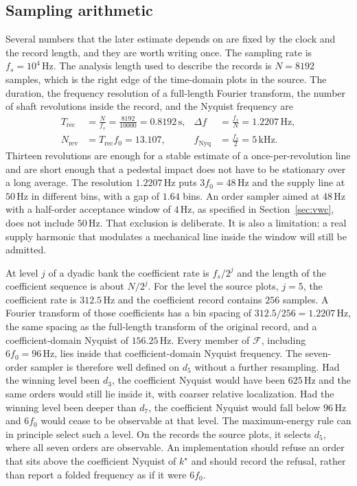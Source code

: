 \subsection{Sampling arithmetic}

Several numbers that the later estimate depends on are fixed by the clock and the record length, and they are worth writing once.
The sampling rate is \(f_{s}=10^{4}\,\mathrm{Hz}\).
The analysis length used to describe the records is \(N=8192\) samples, which is the right edge of the time-domain plots in the source.
The duration, the frequency resolution of a full-length Fourier transform, the number of shaft revolutions inside the record, and the Nyquist frequency are
\begin{align}
T_{\mathrm{rec}}&=\frac{N}{f_{s}}=\frac{8192}{10000}=0.8192\,\mathrm{s},&
\Delta f&=\frac{f_{s}}{N}=1.2207\,\mathrm{Hz},\\
N_{\mathrm{rev}}&=T_{\mathrm{rec}} f_{0}=13.107,&
f_{\mathrm{Nyq}}&=\frac{f_{s}}{2}=5\,\mathrm{kHz}.
\label{eq:arith}
\end{align}
Thirteen revolutions are enough for a stable estimate of a once-per-revolution line and are short enough that a pedestal impact does not have to be stationary over a long average.
The resolution \(1.2207\,\mathrm{Hz}\) puts \(3f_{0}=48\,\mathrm{Hz}\) and the supply line at \(50\,\mathrm{Hz}\) in different bins, with a gap of \(1.64\) bins.
An order sampler aimed at \(48\,\mathrm{Hz}\) with a half-order acceptance window of \(4\,\mathrm{Hz}\), as specified in Section~\ref{sec:vwc}, does not include \(50\,\mathrm{Hz}\).
That exclusion is deliberate.
It is also a limitation: a real supply harmonic that modulates a mechanical line inside the window will still be admitted.

At level \(j\) of a dyadic bank the coefficient rate is \(f_{s}/2^{j}\) and the length of the coefficient sequence is about \(N/2^{j}\).
For the level the source plots, \(j=5\), the coefficient rate is \(312.5\,\mathrm{Hz}\) and the coefficient record contains \(256\) samples.
A Fourier transform of those coefficients has a bin spacing of \(312.5/256=1.2207\,\mathrm{Hz}\), the same spacing as the full-length transform of the original record, and a coefficient-domain Nyquist of \(156.25\,\mathrm{Hz}\).
Every member of \(\mathcal{F}\), including \(6f_{0}=96\,\mathrm{Hz}\), lies inside that coefficient-domain Nyquist frequency.
The seven-order sampler is therefore well defined on \(d_{5}\) without a further resampling.
Had the winning level been \(d_{3}\), the coefficient Nyquist would have been \(625\,\mathrm{Hz}\) and the same orders would still lie inside it, with coarser relative localization.
Had the winning level been deeper than \(d_{7}\), the coefficient Nyquist would fall below \(96\,\mathrm{Hz}\) and \(6f_{0}\) would cease to be observable at that level.
The maximum-energy rule can in principle select such a level.
On the records the source plots, it selects \(d_{5}\), where all seven orders are observable.
An implementation should refuse an order that sits above the coefficient Nyquist of \(k^{\star}\) and should record the refusal, rather than report a folded frequency as if it were \(6f_{0}\).

